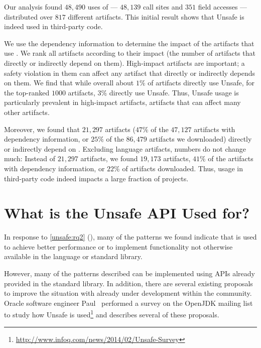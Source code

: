 Our analysis found $48,490$ uses of  --- $48,139$ call sites and $351$ field accesses --- distributed over $817$ different artifacts.
This initial result shows that Unsafe is indeed used in third-party code.

We use the dependency information to determine the impact of the artifacts that use .
We rank all artifacts according to their impact (the number of artifacts that directly or indirectly depend on them).
High-impact artifacts are important;
a safety violation in them can affect any artifact that directly or indirectly depends on them.
We find that while overall about $1\%$ of artifacts directly use Unsafe,
for the top-ranked $1000$ artifacts, $3\%$ directly use Unsafe.
Thus, Unsafe usage is particularly prevalent in high-impact artifacts, artifacts that can affect many other artifacts.

Moreover, we found that $21,297$ artifacts ($47\%$ of the $47,127$ artifacts with dependency information, or $25\%$ of the $86,479$ artifacts we downloaded) directly or indirectly depend on .
Excluding language artifacts, numbers do not change much:
Instead of $21,297$ artifacts, we found $19,173$ artifacts,
$41\%$ of the artifacts with dependency information, or $22\%$ of artifacts downloaded.
Thus,  usage in third-party code indeed impacts a large fraction of projects.




\section{What is the Unsafe API Used for?}
\label{sec:unsafe:discussion}

In response to \ref{unsafe:rq2} (\emph{\urqB}),
many of the patterns we found indicate that \unsafe{} is used to achieve 
better performance or to implement functionality not otherwise available in the \java{} language or standard library.

However, many of the patterns described can be implemented using APIs
already provided in the \java{} standard library. 
In addition, there are several existing proposals to improve the situation
with \unsafe{} already under development within the \java{} community.
Oracle software engineer Paul~\cite{psandoz14} performed a survey on
the OpenJDK mailing list to
study how Unsafe is
used\footnote{\url{http://www.infoq.com/news/2014/02/Unsafe-Survey}} and
describes several of these proposals.

